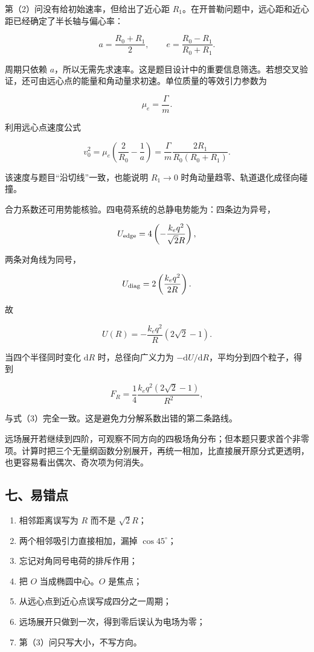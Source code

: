 \documentclass[12pt,a4paper,UTF8]{ctexart}
\newcommand{\tightlist}{\setlength{\itemsep}{0pt}\setlength{\parskip}{0pt}}
\begin{document}
第（2）问没有给初始速率，但给出了近心距
\(R_1\)。在开普勒问题中，远心距和近心距已经确定了半长轴与偏心率：

\[
a=\frac{R_0+R_1}{2},
\qquad
e=\frac{R_0-R_1}{R_0+R_1}.
\]

周期只依赖
\(a\)，所以无需先求速率。这是题目设计中的重要信息筛选。若想交叉验证，还可由远心点的能量和角动量求初速。单位质量的等效引力参数为

\[
\mu_e=\frac{\Gamma}{m}.
\]

利用远心点速度公式

\[
v_0^2
=\mu_e\left(\frac2{R_0}-\frac1a\right)
=\frac{\Gamma}{m}
\frac{2R_1}{R_0(R_0+R_1)}.
\]

该速度与题目``沿切线''一致，也能说明 \(R_1\to0\)
时角动量趋零、轨道退化成径向碰撞。

合力系数还可用势能核验。四电荷系统的总静电势能为：四条边为异号，

\[
U_{\rm edge}
=4\left(-\frac{k_eq^2}{\sqrt2R}\right),
\]

两条对角线为同号，

\[
U_{\rm diag}
=2\left(\frac{k_eq^2}{2R}\right).
\]

故

\[
U(R)
=-\frac{k_eq^2}{R}(2\sqrt2-1).
\]

当四个半径同时变化 \(\mathrm dR\) 时，总径向广义力为
\(-\mathrm dU/\mathrm dR\)，平均分到四个粒子，得到

\[
F_R
=\frac14\frac{k_eq^2(2\sqrt2-1)}{R^2},
\]

与式（3）完全一致。这是避免力分解系数出错的第二条路线。

远场展开若继续到四阶，可观察不同方向的四极场角分布；但本题只要求首个非零项。计算时把三个无量纲函数分别展开，再统一相加，比直接展开原分式更透明，也更容易看出偶次、奇次项为何消失。

\subsection{七、易错点}\label{ux4e03ux6613ux9519ux70b9-4}

\begin{enumerate}
\def\labelenumi{\arabic{enumi}.}
\tightlist
\item
  相邻距离误写为 \(R\) 而不是 \(\sqrt2R\)；
\item
  两个相邻吸引力直接相加，漏掉 \(\cos45^\circ\)；
\item
  忘记对角同号电荷的排斥作用；
\item
  把 \(O\) 当成椭圆中心。\(O\) 是焦点；
\item
  从远心点到近心点误写成四分之一周期；
\item
  远场展开只做到一次，得到零后误认为电场为零；
\item
  第（3）问只写大小，不写方向。
\end{enumerate}
\end{document}
